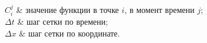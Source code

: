 \begin{conditions}
	$C^{j}_{i}$ & значение функции в точке $i$, в момент времени $j$;\\
	$\Delta t$ & шаг сетки по времени;\\
	$\Delta x$ & шаг сетки по координате.
\end{conditions}


